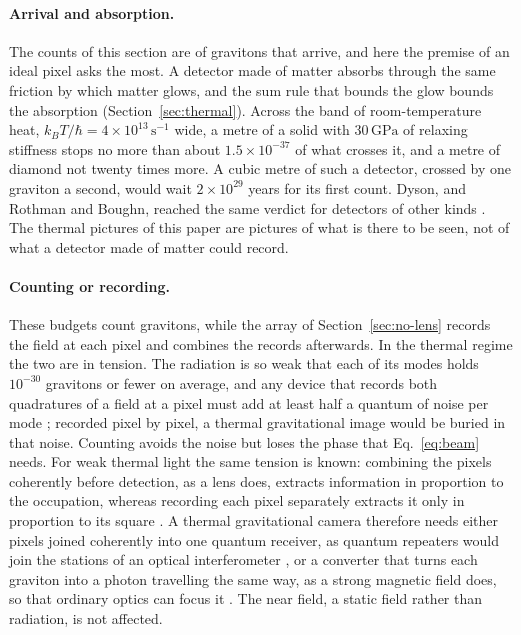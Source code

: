 \paragraph{Arrival and absorption.} The counts of this section are of gravitons
that arrive, and here the premise of an ideal pixel asks the most. A detector
made of matter absorbs through the same friction by which matter glows, and the
sum rule that bounds the glow bounds the absorption (Section~\ref{sec:thermal}). Across
the band of room-temperature heat, $k_BT/\hbar = 4\times10^{13}\,\mathrm{s^{-1}}$
wide, a metre of a solid with $30\,\mathrm{GPa}$ of relaxing stiffness stops no
more than about $1.5\times10^{-37}$ of what crosses it, and a metre of diamond
not twenty times more. A cubic metre of such a detector, crossed by one graviton
a second, would wait $2\times10^{29}$ years for its first count. Dyson, and
Rothman and Boughn, reached the same verdict for detectors of other kinds
\cite{Dyson2013,RothmanBoughn2006}. The thermal pictures of this paper are
pictures of what is there to be seen, not of what a detector made of matter
could record.

\paragraph{Counting or recording.} These budgets count gravitons, while the
array of Section~\ref{sec:no-lens} records the field at each pixel and
combines the records afterwards. In the thermal regime the two are in
tension. The radiation is so weak that each of its modes holds
$10^{-30}$ gravitons or fewer on average, and any device that records both quadratures
of a field at a pixel must add at least half a quantum of noise per mode
\cite{Caves1982}; recorded pixel by pixel, a thermal gravitational image would
be buried in that noise. Counting avoids the noise but loses the phase that
Eq.~\eqref{eq:beam} needs. For weak thermal light the same tension is known:
combining the pixels coherently before detection, as a lens does, extracts
information in proportion to the occupation, whereas recording each pixel
separately extracts it only in proportion to its square
\cite{Tsang2011,CarneyDomckeRodd2024}. A thermal gravitational camera
therefore needs either pixels joined coherently into one quantum receiver, as
quantum repeaters would join the stations of an optical interferometer
\cite{Gottesman2012}, or a
converter that turns each graviton into a photon travelling the same way, as a
strong magnetic field does, so that ordinary optics can focus it
\cite{Dyson2013}. The near field, a static field rather than radiation, is not
affected.

